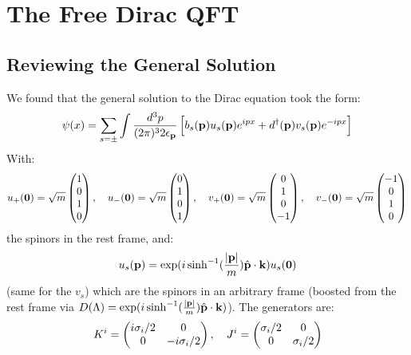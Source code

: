 \section{The Free Dirac QFT}
\subsection{Reviewing the General Solution}
We found that the general solution to the Dirac equation took the form:
\begin{equation}\label{eq:psix}
    \psi(x) = \sum_{s=\pm}\int \frac{d^3p}{(2\pi)^32\epsilon_{\mathbf{p}}}\left[b_s(\mathbf{p})u_s(\mathbf{p})e^{ipx} + d^\dagger(\mathbf{p})v_s(\mathbf{p})e^{-ipx}\right]
\end{equation}
With:
\begin{equation}
    u_+(\mathbf{0}) = \sqrt{m}\begin{pmatrix}1\\0\\1\\0\end{pmatrix}, \quad u_-(\mathbf{0})=\sqrt{m}\begin{pmatrix}0\\1\\0\\1\end{pmatrix}, \quad v_+(\mathbf{0}) = \sqrt{m}\begin{pmatrix}0\\1\\0\\-1\end{pmatrix}, \quad v_-(\mathbf{0}) = \sqrt{m}\begin{pmatrix}-1\\0\\1\\0\end{pmatrix}
\end{equation}
the spinors in the rest frame, and:
\begin{equation}
    u_s(\mathbf{p}) = \exp(i\sinh^{-1}(\frac{\lvert \mathbf{p} \rvert}{m})\hat{\mathbf{p}}\cdot\mathbf{k})u_s(\mathbf{0})
\end{equation}
(same for the $v_s$) which are the spinors in an arbitrary frame (boosted from the rest frame via $D(\Lambda) = \exp(i\sinh^{-1}(\frac{\lvert \mathbf{p} \rvert}{m})\hat{\mathbf{p}}\cdot\mathbf{k})$). The generators are:
\begin{equation}
    K^i = \begin{pmatrix}i\sigma_{i}/2 & 0 \\ 0 & -i\sigma_i/2\end{pmatrix}, \quad J^i = \begin{pmatrix}\sigma_i/2 & 0 \\ 0 & \sigma_i/2\end{pmatrix}
\end{equation}

